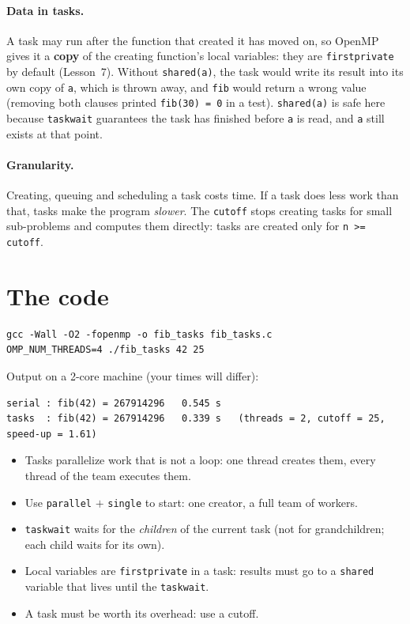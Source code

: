 \documentclass[11pt,a4paper]{article}
\let\origtexttt\texttt
\renewcommand{\texttt}[1]{\textcolor{black!60}{\origtexttt{#1}}}
\begin{document}
\paragraph{Data in tasks.} A task may run after the function that created it has moved on,
so OpenMP gives it a \textbf{copy} of the creating function's local variables:
they are \texttt{firstprivate} by default (Lesson~7). Without \texttt{shared(a)}, the task
would write its result into its own copy of \texttt{a}, which is thrown away, and
\texttt{fib} would return a wrong value (removing both clauses printed
\texttt{fib(30) = 0} in a test).
\texttt{shared(a)} is safe here because \texttt{taskwait} guarantees the task has finished
before \texttt{a} is read, and \texttt{a} still exists at that point.

\paragraph{Granularity.} Creating, queuing and scheduling a task costs time. If a task does
less work than that, tasks make the program \emph{slower}. The \texttt{cutoff} stops creating
tasks for small sub-problems and computes them directly: tasks are created only for
\texttt{n >= cutoff}.

\section{The code}


\begin{lstlisting}[style=sh]
gcc -Wall -O2 -fopenmp -o fib_tasks fib_tasks.c
OMP_NUM_THREADS=4 ./fib_tasks 42 25
\end{lstlisting}
Output on a 2-core machine (your times will differ):
\begin{lstlisting}[style=sh]
serial : fib(42) = 267914296   0.545 s
tasks  : fib(42) = 267914296   0.339 s   (threads = 2, cutoff = 25, speed-up = 1.61)
\end{lstlisting}

\begin{keyidea}
\begin{itemize}
  \item Tasks parallelize work that is not a loop: one thread creates them, every thread of
        the team executes them.
  \item Use \texttt{parallel} $+$ \texttt{single} to start: one creator, a full team of
        workers.
  \item \texttt{taskwait} waits for the \emph{children} of the current task (not for
        grandchildren; each child waits for its own).
  \item Local variables are \texttt{firstprivate} in a task: results must go to a
        \texttt{shared} variable that lives until the \texttt{taskwait}.
  \item A task must be worth its overhead: use a cutoff.
\end{itemize}
\end{keyidea}
\end{document}
